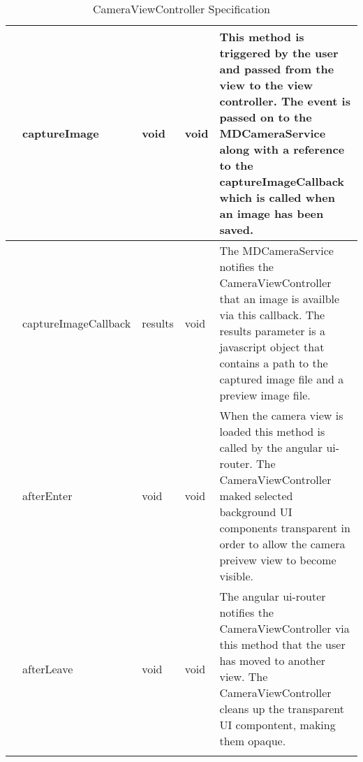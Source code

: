 {\begin{longtable}[H]{  | >{\bfseries}p{2cm} | p{2.2cm} | p{1.5cm} | p{1.5cm} | p{4cm} | }
        & captureImage & void & void
        & This method is triggered by the user and passed from the view to the view controller. The event is passed on to the MDCameraService along with a reference to the captureImageCallback which is called when an image has been saved.
        \\ \hline
        & captureImageCallback & results & void
        & The MDCameraService notifies the CameraViewController that an image is availble via this callback. The results parameter is a javascript object that contains a path to the captured image file and a preview image file.
        \\ \hline
        & afterEnter & void & void
        & When the camera view is loaded this method is called by the angular ui-router. The CameraViewController maked selected background UI components transparent in order to allow the camera preivew view to become visible.
        \\ \hline
        & afterLeave & void & void
        & The angular ui-router notifies the CameraViewController via this method that the user has moved to another view. The CameraViewController cleans up the transparent UI compontent, making them opaque.
        \\ \hline


    \caption{CameraViewController Specification}
    \label{fig:camera_controller}
\end{longtable}
}